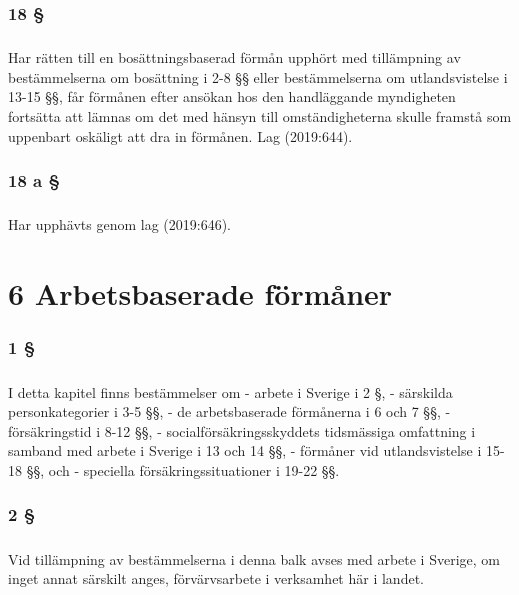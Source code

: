 \documentclass[a4paper,notitlepage,openany,10pt]{book}
\begin{document}
\subsection*{18 §}
\paragraph*{}
Har rätten till en bosättningsbaserad förmån upphört med tillämpning av bestämmelserna om bosättning i 2-8 §§ eller bestämmelserna om utlandsvistelse i 13-15 §§, får förmånen efter ansökan hos den handläggande myndigheten fortsätta att lämnas om det med hänsyn till omständigheterna skulle framstå som uppenbart oskäligt att dra in förmånen.
Lag (2019:644).
\subsection*{18 a §}
\paragraph*{}
Har upphävts genom
lag (2019:646).
\chapter*{6 Arbetsbaserade förmåner}
\subsection*{1 §}
\paragraph*{}
I detta kapitel finns bestämmelser om
\newline - arbete i Sverige i 2 §,
\newline - särskilda personkategorier i 3-5 §§,
\newline - de arbetsbaserade förmånerna i 6 och 7 §§,
\newline - försäkringstid i 8-12 §§,
\newline - socialförsäkringsskyddets tidsmässiga omfattning i samband med arbete i Sverige i 13 och 14 §§,
\newline - förmåner vid utlandsvistelse i 15-18 §§, och
\newline - speciella försäkringssituationer i 19-22 §§.
\subsection*{2 §}
\paragraph*{}
Vid tillämpning av bestämmelserna i denna balk avses med arbete i Sverige, om inget annat särskilt anges, förvärvsarbete i verksamhet här i landet.
\end{document}
